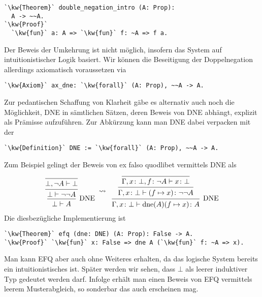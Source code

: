 \begin{lstlisting}[escapechar=`, xleftmargin=\mathindent]
`\kw{Theorem}` double_negation_intro (A: Prop):
  A -> ~~A.
`\kw{Proof}`
  `\kw{fun}` a: A => `\kw{fun}` f: ~A => f a.
\end{lstlisting}

\noindent
Der Beweis der Umkehrung ist nicht möglich, insofern das System auf
intuitionistischer Logik basiert. Wir können die Beseitigung der
Doppelnegation allerdings axiomatisch voraussetzen via

\begin{lstlisting}[escapechar=`, xleftmargin=\mathindent]
`\kw{Axiom}` ax_dne: `\kw{forall}` (A: Prop), ~~A -> A.
\end{lstlisting}

\noindent
Zur pedantischen Schaffung von Klarheit gäbe es alternativ auch noch
die Möglichkeit, DNE in sämtlichen Sätzen, deren Beweis von DNE abhängt,
explizit als Prämisse aufzuführen. Zur Abkürzung kann man DNE dabei
verpacken mit der

\begin{lstlisting}[escapechar=`, xleftmargin=\mathindent]
`\kw{Definition}` DNE := `\kw{forall}` (A: Prop), ~~A -> A.
\end{lstlisting}

\noindent
Zum Beispiel gelingt der Beweis von ex falso quodlibet vermittels DNE als
\[\begin{prooftree}
    \infer0{\bot,\lnot A\vdash\bot}
  \infer1{\bot\vdash\lnot\lnot A}
\infer1[DNE]{\bot\vdash A}
\end{prooftree}
\;\rightsquigarrow\;\;
\begin{prooftree}
    \infer0{\Gamma,x\colon \bot,f\colon \lnot A\vdash x\colon \bot}
  \infer1{\Gamma,x\colon\bot\vdash (f\mapsto x)\colon \lnot\lnot A}
\infer1[DNE]{\Gamma,x\colon\bot\vdash \mathrm{dne}(A)(f\mapsto x)\colon A}
\end{prooftree}\]
Die diesbezügliche Implementierung ist

\begin{lstlisting}[escapechar=`, xleftmargin=\mathindent]
`\kw{Theorem}` efq (dne: DNE) (A: Prop): False -> A.
`\kw{Proof}` `\kw{fun}` x: False => dne A (`\kw{fun}` f: ~A => x).
\end{lstlisting}

\noindent
Man kann EFQ aber auch ohne Weiteres erhalten, da das logische System
bereits ein intuitionistisches ist. Später werden wir sehen, dass
$\bot$ als leerer induktiver Typ gedeutet werden darf. Infolge erhält man
einen Beweis von EFQ vermittels leerem Musterabgleich, so sonderbar das
auch erscheinen mag.

